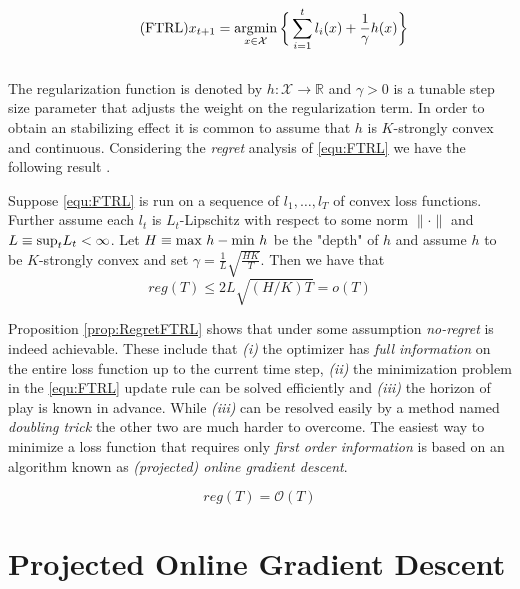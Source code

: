 \begin{equation}
    \tag{FTRL}
    x_{t+1} = \operatorname*{\arg\!\min}_{x \in \mathcal{X}} \bigg\{\sum_{i=1}^t l_i(x) + \frac{1}{\gamma}h(x)\bigg\}
    \label{equ:FTRL}
\end{equation} \\

The regularization function is denoted by $h: \mathcal{X} \to \mathbb{R}$ and $\gamma > 0$ is a tunable step size parameter that adjusts the weight on the regularization term. In order to obtain an stabilizing effect it is common to assume that $h$ is $K$-strongly convex and continuous. Considering the \textit{regret} analysis of \ref{equ:FTRL} we have the following result \cite[Theorem 2.1]{HDRmertikopoulos}.

\begin{proposition}\label{prop:RegretFTRL}
    Suppose \ref{equ:FTRL} is run on a sequence of $l_1,\dots,l_T$ of convex loss functions. Further assume each $l_t$ is $L_t$-Lipschitz with respect to some norm $\|\cdot\|$ and $L \equiv \textnormal{sup}_t L_t < \infty$. Let $H \equiv \textnormal{max } h-\textnormal{min } h$ be the "depth" of $h$ and assume $h$ to be $K$-strongly convex and set $\gamma = \frac{1}{L}\sqrt{\frac{HK}{T}}$. Then we have that
    \[reg(T) \le 2L\sqrt{(H/K)T} = o(T)\]
\end{proposition} 

Proposition \ref{prop:RegretFTRL} shows that under some assumption \textit{no-regret} is indeed achievable. These include that \textit{(i)} the optimizer has \textit{full information} on the entire loss function up to the current time step, \textit{(ii)} the minimization problem in the \ref{equ:FTRL} update rule can be solved efficiently and \textit{(iii)} the horizon of play is known in advance. While \textit{(iii)} can be resolved easily by a method named \textit{doubling trick} \cite{shalev} the other two are much harder to overcome. The easiest way to minimize a loss function that requires only \textit{first order information} is based on an algorithm known as \textit{(projected) online gradient descent}.

\begin{equation*}
    reg(T) = \mathcal{O}(T)
\end{equation*}


\section{Projected Online Gradient Descent}\label{section:ProjectedOnlineGradienDescent}

